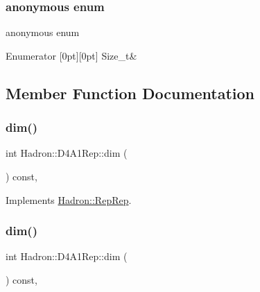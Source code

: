 \subsubsection{\texorpdfstring{anonymous enum}{anonymous enum}}
{\footnotesize\ttfamily anonymous enum}

\begin{DoxyEnumFields}{Enumerator}
[0pt][0pt]{}\mbox{\label{structHadron_1_1D4A1Rep_af76b07cc71127fb00d887a5e56eafb8aa3cf2a8c71c879cfca394020d7c360d0e}} 
Size\+\_\+t&\\
\hline

\end{DoxyEnumFields}


\subsection{Member Function Documentation}
\mbox{\label{structHadron_1_1D4A1Rep_ae553df618a4dc5019fa2b0d1c43443b0}} 
\subsubsection{\texorpdfstring{dim()}{dim()}\hspace{0.1cm}{\footnotesize\ttfamily [1/5]}}
{\footnotesize\ttfamily int Hadron\+::\+D4\+A1\+Rep\+::dim (\begin{DoxyParamCaption}{ }\end{DoxyParamCaption}) const\hspace{0.3cm}{\ttfamily [inline]}, {\ttfamily [virtual]}}



Implements \mbox{\hyperlink{structHadron_1_1RepRep_a92c8802e5ed7afd7da43ccfd5b7cd92b}{Hadron\+::\+Rep\+Rep}}.

\mbox{\label{structHadron_1_1D4A1Rep_ae553df618a4dc5019fa2b0d1c43443b0}} 
\subsubsection{\texorpdfstring{dim()}{dim()}\hspace{0.1cm}{\footnotesize\ttfamily [2/5]}}
{\footnotesize\ttfamily int Hadron\+::\+D4\+A1\+Rep\+::dim (\begin{DoxyParamCaption}{ }\end{DoxyParamCaption}) const\hspace{0.3cm}{\ttfamily [inline]}, {\ttfamily [virtual]}}



